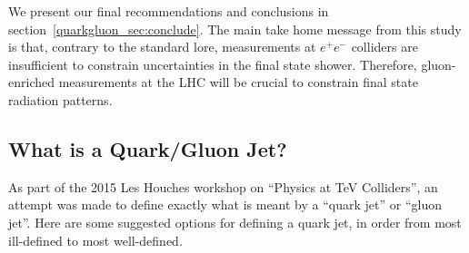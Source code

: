 \documentclass[11pt]{cernrep}
\begin{document}
We present our final recommendations and conclusions in section~\ref{quarkgluon_sec:conclude}.  The main take home message from this study is that, contrary to the standard lore, measurements at $e^+e^-$ colliders are insufficient to constrain uncertainties in the final state shower.   Therefore, gluon-enriched measurements at the LHC will be crucial to constrain final state radiation patterns.

\subsection{What is a Quark/Gluon Jet?}
\label{quarkgluon_sec:def}

As part of the 2015 Les Houches workshop on ``Physics at TeV Colliders'', an attempt was made to define exactly what is meant by a ``quark jet'' or ``gluon jet''.  Here are some suggested options for defining a quark jet, in order from most ill-defined to most well-defined.
\end{document}
